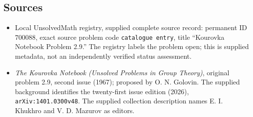 \documentclass[11pt]{article}
\begin{document}
\subsection{Sources}
\begin{itemize}
\item Local UnsolvedMath registry, supplied complete source record: permanent ID \(700088\), exact source problem code \texttt{catalogue entry}, title ``Kourovka Notebook Problem 2.9.'' The registry labels the problem open; this is supplied metadata, not an independently verified status assessment.
\item \emph{The Kourovka Notebook (Unsolved Problems in Group Theory)}, original problem 2.9, second issue (1967); proposed by O. N. Golovin. The supplied background identifies the twenty-first issue edition (2026), \texttt{arXiv:1401.0300v48}. The supplied collection description names E. I. Khukhro and V. D. Mazurov as editors.
\end{itemize}
\end{document}
